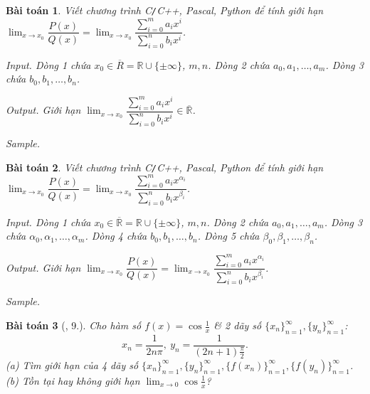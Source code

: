 \documentclass{article}
\newtheorem{baitoan}{Bài toán}
\begin{document}
\begin{baitoan}
	Viết chương trình {\sf C{\tt/}C++, Pascal, Python} để tính giới hạn $\lim_{x\to x_0} \dfrac{P(x)}{Q(x)} = \lim_{x\to x_0} \dfrac{\sum_{i=0}^m a_ix^i}{\sum_{i=0}^n b_ix^i}$.
	
	\item {\sf Input.} Dòng 1 chứa $x_0\in\overline{R} = \mathbb{R}\cup\{\pm\infty\}$, $m,n$. Dòng 2 chứa $a_0,a_1,\ldots,a_m$. Dòng 3 chứa $b_0,b_1,\ldots,b_n$.
	\item {\sf Output.} Giới hạn $\lim_{x\to x_0} \dfrac{\sum_{i=0}^m a_ix^i}{\sum_{i=0}^n b_ix^i}\in\overline{\mathbb{R}}$.
	\item {\sf Sample.}
	\begin{table}[H]
		\centering
	\end{table}
\end{baitoan}

\begin{baitoan}
	Viết chương trình {\sf C{\tt/}C++, Pascal, Python} để tính giới hạn $\lim_{x\to x_0} \dfrac{P(x)}{Q(x)} = \lim_{x\to x_0} \dfrac{\sum_{i=0}^m a_ix^{\alpha_i}}{\sum_{i=0}^n b_ix^{\beta_i}}$.
	
	\item {\sf Input.} Dòng 1 chứa $x_0\in\overline{\mathbb{R}} = \mathbb{R}\cup\{\pm\infty\}$, $m,n$. Dòng 2 chứa $a_0,a_1,\ldots,a_m$. Dòng 3 chứa $\alpha_0,\alpha_1,\ldots,\alpha_m$. Dòng 4 chứa $b_0,b_1,\ldots,b_n$. Dòng 5 chứa $\beta_0,\beta_1,\ldots,\beta_n$.
	\item {\sf Output.} Giới hạn $\lim_{x\to x_0} \dfrac{P(x)}{Q(x)} = \lim_{x\to x_0} \dfrac{\sum_{i=0}^m a_ix^{\alpha_i}}{\sum_{i=0}^n b_ix^{\beta_i}}$.
	\item {\sf Sample.}
	\begin{table}[H]
		\centering
	\end{table}
\end{baitoan}

\begin{baitoan}[\cite{TLCT_dai_so_giai_tich_11}, 9.]
	Cho hàm số $f(x) = \cos\frac{1}{x}$ \& 2 dãy số $\{x_n\}_{n=1}^\infty,\{y_n\}_{n=1}^\infty$:
	\begin{equation*}
		x_n = \frac{1}{2n\pi},\ y_n = \frac{1}{(2n + 1)\frac{\pi}{2}}.
	\end{equation*}
	(a) Tìm giới hạn của 4 dãy số $\{x_n\}_{n=1}^\infty,\{y_n\}_{n=1}^\infty,\{f(x_n)\}_{n=1}^\infty,\{f(y_n)\}_{n=1}^\infty$. (b) Tồn tại hay không giới hạn $\lim_{x\to0} \cos\frac{1}{x}$?
\end{baitoan}
\end{document}

